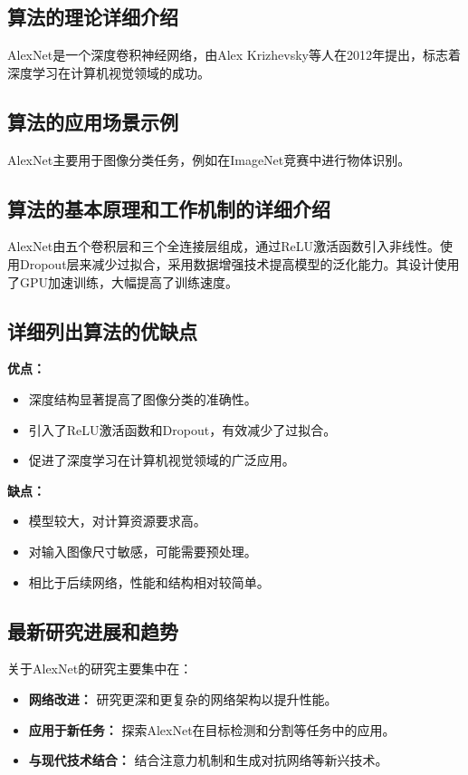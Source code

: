 \subsection*{算法的理论详细介绍}
AlexNet是一个深度卷积神经网络，由Alex Krizhevsky等人在2012年提出，标志着深度学习在计算机视觉领域的成功。

\subsection*{算法的应用场景示例}
AlexNet主要用于图像分类任务，例如在ImageNet竞赛中进行物体识别。

\subsection*{算法的基本原理和工作机制的详细介绍}
AlexNet由五个卷积层和三个全连接层组成，通过ReLU激活函数引入非线性。使用Dropout层来减少过拟合，采用数据增强技术提高模型的泛化能力。其设计使用了GPU加速训练，大幅提高了训练速度。

\subsection*{详细列出算法的优缺点}
\textbf{优点：}
\begin{itemize}
    \item 深度结构显著提高了图像分类的准确性。
    \item 引入了ReLU激活函数和Dropout，有效减少了过拟合。
    \item 促进了深度学习在计算机视觉领域的广泛应用。
\end{itemize}

\textbf{缺点：}
\begin{itemize}
    \item 模型较大，对计算资源要求高。
    \item 对输入图像尺寸敏感，可能需要预处理。
    \item 相比于后续网络，性能和结构相对较简单。
\end{itemize}

\subsection*{最新研究进展和趋势}
关于AlexNet的研究主要集中在：
\begin{itemize}
    \item \textbf{网络改进：} 研究更深和更复杂的网络架构以提升性能。
    \item \textbf{应用于新任务：} 探索AlexNet在目标检测和分割等任务中的应用。
    \item \textbf{与现代技术结合：} 结合注意力机制和生成对抗网络等新兴技术。
\end{itemize}
